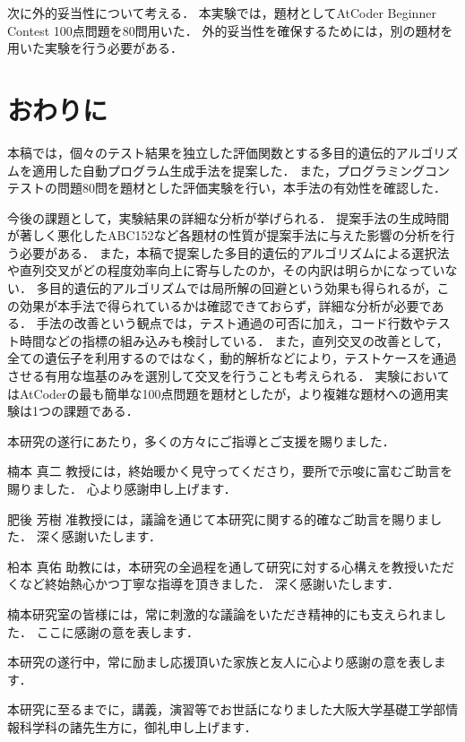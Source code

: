 \documentclass[uplatex,dvipdfmx,a4paper]{jsarticle}
\begin{document}
次に外的妥当性について考える．
本実験では，題材としてAtCoder Beginner Contest 100点問題を80問用いた．
外的妥当性を確保するためには，別の題材を用いた実験を行う必要がある．


\clearpage
\section{おわりに}
本稿では，個々のテスト結果を独立した評価関数とする多目的遺伝的アルゴリズムを適用した自動プログラム生成手法を提案した．
また，プログラミングコンテストの問題80問を題材とした評価実験を行い，本手法の有効性を確認した．

今後の課題として，実験結果の詳細な分析が挙げられる．
提案手法の生成時間が著しく悪化したABC152など各題材の性質が提案手法に与えた影響の分析を行う必要がある．
また，本稿で提案した多目的遺伝的アルゴリズムによる選択法や直列交叉がどの程度効率向上に寄与したのか，その内訳は明らかになっていない．
多目的遺伝的アルゴリズムでは局所解の回避という効果も得られるが，この効果が本手法で得られているかは確認できておらず，詳細な分析が必要である．
手法の改善という観点では，テスト通過の可否に加え，コード行数やテスト時間などの指標の組み込みも検討している．
また，直列交叉の改善として，全ての遺伝子を利用するのではなく，動的解析などにより，テストケースを通過させる有用な塩基のみを選別して交叉を行うことも考えられる．
実験においてはAtCoderの最も簡単な100点問題を題材としたが，より複雑な題材への適用実験は1つの課題である．

\clearpage
\acknowledgement

本研究の遂行にあたり，多くの方々にご指導とご支援を賜りました．

楠本 真二 教授には，終始暖かく見守ってくださり，要所で示唆に富むご助言を賜りました．
心より感謝申し上げます．

肥後 芳樹 准教授には，議論を通じて本研究に関する的確なご助言を賜りました．
深く感謝いたします．

柗本 真佑 助教には，本研究の全過程を通して研究に対する心構えを教授いただくなど終始熱心かつ丁寧な指導を頂きました．
深く感謝いたします．

楠本研究室の皆様には，常に刺激的な議論をいただき精神的にも支えられました．
ここに感謝の意を表します．

本研究の遂行中，常に励まし応援頂いた家族と友人に心より感謝の意を表します．

本研究に至るまでに，講義，演習等でお世話になりました大阪大学基礎工学部情報科学科の諸先生方に，御礼申し上げます．




\clearpage


\end{document}
